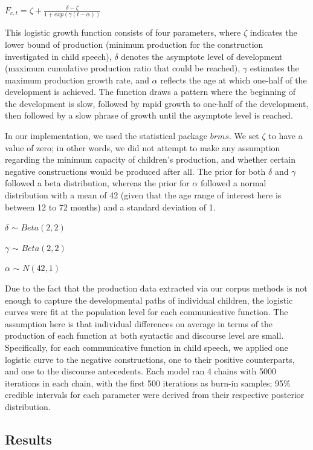 \documentclass[
  english,
  man,floatsintext]{apa6}
\begin{document}
\(F_{c, t} = \zeta + \frac{\delta - \zeta}{1 + exp(\gamma(t - \alpha))}\)

This logistic growth function consists of four parameters, where \(\zeta\) indicates the lower bound of production (minimum production for the construction investigated in child speech), \(\delta\) denotes the asymptote level of development (maximum cumulative production ratio that could be reached), \(\gamma\) estimates the maximum production growth rate, and \(\alpha\) reflects the age at which one-half of the development is achieved. The function draws a pattern where the beginning of the development is slow, followed by rapid growth to one-half of the development, then followed by a slow phrase of growth until the asymptote level is reached.

In our implementation, we used the statistical package \(brms\). We set \(\zeta\) to have a value of zero; in other words, we did not attempt to make any assumption regarding the minimum capacity of children's production, and whether certain negative constructions would be produced after all. The prior for both \(\delta\) and \(\gamma\) followed a beta distribution, whereas the prior for \(\alpha\) followed a normal distribution with a mean of 42 (given that the age range of interest here is between 12 to 72 months) and a standard deviation of 1.

\(\delta\) \(\sim\) \(Beta(2, 2)\)

\(\gamma\) \(\sim\) \(Beta(2, 2)\)

\(\alpha\) \(\sim\) \(N(42, 1)\)

Due to the fact that the production data extracted via our corpus methods is not enough to capture the developmental paths of individual children, the logistic curves were fit at the population level for each communicative function. The assumption here is that individual differences on average in terms of the production of each function at both syntactic and discourse level are small. Specifically, for each communicative function in child speech, we applied one logistic curve to the negative constructions, one to their positive counterparts, and one to the discourse antecedents. Each model ran 4 chains with 5000 iterations in each chain, with the first 500 iterations as burn-in samples; 95\% credible intervals for each parameter were derived from their respective posterior distribution.

\hypertarget{results}{%
\subsection{Results}\label{results}}
\end{document}
